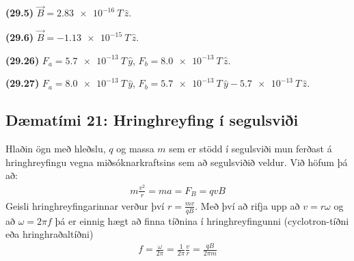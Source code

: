 \begin{enumerate}[label = \textbf{(\alph*)}]
\begin{tcolorbox}
\begin{enumerate*}[label = ]
  \item \textbf{(29.5)} $\vec{B} = \SI{2.83e-16}{T} \, \hat{z}$.
  \item \textbf{(29.6)} $\vec{B} = -\SI{1.13e-15}{T}\, \hat{z}$.
  \item \textbf{(29.26)} $F_a = \SI{5.7e-13}{T}\, \hat{y}$, $F_b = \SI{8.0e-13}{T} \, \hat{z}$.
  \item \textbf{(29.27)} $F_a = \SI{8.0e-13}{T}\, \hat{y}$, $F_b = \SI{5.7e-13}{T} \, \hat{y} - \SI{5.7e-13}{T} \, \hat{z}$.
\end{enumerate*}
\end{tcolorbox}


\end{enumerate}

\newpage

\subsection*{Dæmatími 21: Hringhreyfing í segulsviði}

\begin{tcolorbox}
Hlaðin ögn með hleðslu, $q$ og massa $m$ sem er stödd í segulsviði mun ferðast á hringhreyfingu vegna miðsóknarkraftsins sem að segulsviðið veldur. Við höfum þá að:
\begin{align*}
 m\frac{v^2}{r} = ma = F_B = qvB
\end{align*}
Geisli hringhreyfingarinnar verður því $r = \frac{mv}{qB}$. Með því að rifja upp að $v = r\omega$ og að $\omega = 2\pi f$ þá er einnig hægt að finna tíðnina í hringhreyfingunni (cyclotron-tíðni eða hringhraðaltíðni)
\begin{align*}
    f = \frac{\omega}{2\pi} = \frac{1}{2\pi} \frac{v}{r} = \frac{qB}{2\pi m}
\end{align*}
\end{tcolorbox}

